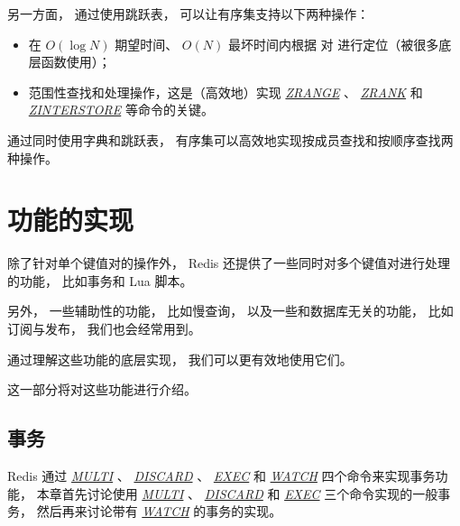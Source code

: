 \documentclass[a4paper,11pt,english]{sphinxmanual}
\begin{document}
另一方面，
通过使用跳跃表，
可以让有序集支持以下两种操作：
\begin{itemize}
\item {} 
在 $O(\log N)$ 期望时间、 $O(N)$ 最坏时间内根据  对  进行定位（被很多底层函数使用）；

\item {} 
范围性查找和处理操作，这是（高效地）实现 \href{http://redis.readthedocs.org/en/latest/sorted\_set/zrange.html\#zrange}{\emph{ZRANGE}} 、 \href{http://redis.readthedocs.org/en/latest/sorted\_set/zrank.html\#zrank}{\emph{ZRANK}} 和 \href{http://redis.readthedocs.org/en/latest/sorted\_set/zinterstore.html\#zinterstore}{\emph{ZINTERSTORE}} 等命令的关键。

\end{itemize}

通过同时使用字典和跳跃表，
有序集可以高效地实现按成员查找和按顺序查找两种操作。


\chapter{功能的实现}
\label{index:id4}
除了针对单个键值对的操作外，
Redis 还提供了一些同时对多个键值对进行处理的功能，
比如事务和 Lua 脚本。

另外，
一些辅助性的功能，
比如慢查询，
以及一些和数据库无关的功能，
比如订阅与发布，
我们也会经常用到。

通过理解这些功能的底层实现，
我们可以更有效地使用它们。

这一部分将对这些功能进行介绍。


\section{事务}
\label{feature/transaction::doc}\label{feature/transaction:id1}
Redis 通过 \href{http://redis.readthedocs.org/en/latest/transaction/multi.html\#multi}{\emph{MULTI}} 、 \href{http://redis.readthedocs.org/en/latest/transaction/discard.html\#discard}{\emph{DISCARD}} 、 \href{http://redis.readthedocs.org/en/latest/transaction/exec.html\#exec}{\emph{EXEC}} 和 \href{http://redis.readthedocs.org/en/latest/transaction/watch.html\#watch}{\emph{WATCH}} 四个命令来实现事务功能，
本章首先讨论使用 \href{http://redis.readthedocs.org/en/latest/transaction/multi.html\#multi}{\emph{MULTI}} 、 \href{http://redis.readthedocs.org/en/latest/transaction/discard.html\#discard}{\emph{DISCARD}} 和 \href{http://redis.readthedocs.org/en/latest/transaction/exec.html\#exec}{\emph{EXEC}} 三个命令实现的一般事务，
然后再来讨论带有 \href{http://redis.readthedocs.org/en/latest/transaction/watch.html\#watch}{\emph{WATCH}} 的事务的实现。
\end{document}
